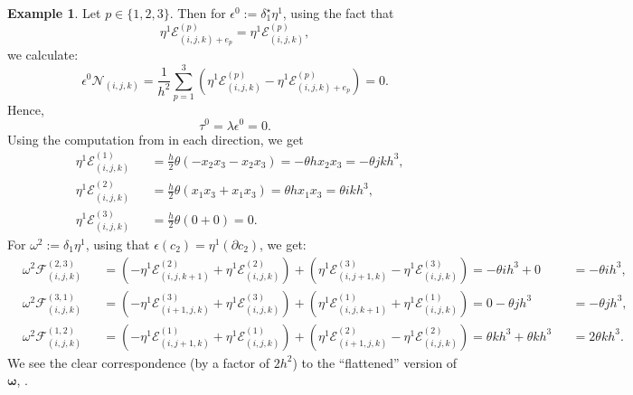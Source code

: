 \documentclass[fleqn]{article}
\theoremstyle{definition}
\newtheorem{example}[theorem]{Example}
\begin{document}
\begin{example}
  Let $p \in \{1, 2, 3\}$.
  Then for $\epsilon^0 := \delta_1^\star \eta^1$, using the fact that
  \begin{equation}
    \eta^1 \mathcal{E}^{(p)}_{(i, j, k) + e_p} =
    \eta^1 \mathcal{E}^{(p)}_{(i, j, k)},
  \end{equation}
  we calculate:
  \begin{equation}
    \epsilon^0 \mathcal{N}_{(i, j, k)}
    =
      \frac{1}{h^2}
      \sum_{p = 1}^3 (
          \eta^1 \mathcal{E}^{(p)}_{(i, j, k)}
        - \eta^1 \mathcal{E}^{(p)}_{(i, j, k) + e_p}
      )
    = 0.
  \end{equation}
  Hence,
  \begin{equation}
    \tau^0 = \lambda \epsilon^0 = 0.
  \end{equation}
  Using the computation from
  in each direction, we get
  \begin{subequations}
    \begin{alignat}{2}
      & \eta^1 \mathcal{E}^{(1)}_{(i, j, k)} &&
        = \frac{h}{2} \theta (-x_2 x_3 - x_2 x_3)
        = - \theta h x_2 x_3
        = - \theta j k h^3, \\
      & \eta^1 \mathcal{E}^{(2)}_{(i, j, k)} &&
        = \frac{h}{2} \theta (x_1 x_3 + x_1 x_3)
        = \theta h x_1 x_3
        = \theta i k h^3, \\
      & \eta^1 \mathcal{E}^{(3)}_{(i, j, k)} &&
        = \frac{h}{2} \theta (0 + 0)
        = 0.
    \end{alignat}
  \end{subequations}
  For $\omega^2 := \delta_1 \eta^1$, using that
  $\epsilon(c_2) = \eta^1(\partial c_2)$, we get:
  \begin{subequations}
    \begin{alignat}{3}
      & \omega^2 \mathcal{F}^{(2, 3)}_{(i, j, k)}
      && =
        ( - \eta^1 \mathcal{E}^{(2)}_{(i, j, k + 1)}
          + \eta^1 \mathcal{E}^{(2)}_{(i, j, k)}
        )
      + ( \eta^1 \mathcal{E}^{(3)}_{(i, j + 1, k)}
          - \eta^1 \mathcal{E}^{(3)}_{(i, j, k)}
        )
      = - \theta i h^3 + 0
      && = - \theta i h^3, \\
%
      & \omega^2 \mathcal{F}^{(3, 1)}_{(i, j, k)}
      && =
        ( - \eta^1 \mathcal{E}^{(3)}_{(i + 1, j, k)}
          + \eta^1 \mathcal{E}^{(3)}_{(i, j, k)}
        )
      + ( \eta^1 \mathcal{E}^{(1)}_{(i, j, k + 1)}
          + \eta^1 \mathcal{E}^{(1)}_{(i, j, k)}
        )
      = 0 - \theta j h^3
      && = - \theta j h^3, \\
%
      & \omega^2 \mathcal{F}^{(1, 2)}_{(i, j, k)}
      && =
        ( - \eta^1 \mathcal{E}^{(1)}_{(i, j + 1, k)}
          + \eta^1 \mathcal{E}^{(1)}_{(i, j, k)}
        )
      + ( \eta^1 \mathcal{E}^{(2)}_{(i + 1, j, k)}
          - \eta^1 \mathcal{E}^{(2)}_{(i, j, k)}
        )
      = \theta k h^3 + \theta k h^3
      && = 2 \theta k h^3.
    \end{alignat}
  \end{subequations}
  We see the clear correspondence (by a factor of $2 h^2$) to the ``flattened''
  version of $\boldsymbol{\omega}$,
  .


\end{example}
\end{document}
